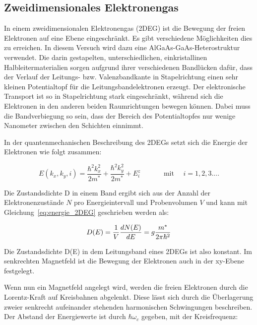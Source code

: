 
\subsection{Zweidimensionales Elektronengas}

In einem zweidimensionalen Elektronengas (2DEG) ist die Bewegung der freien Elektronen auf eine Ebene eingeschränkt. Es gibt verschiedene Möglichkeiten dies zu erreichen. In diesem Versuch wird dazu eine AlGaAs-GaAs-Heterostruktur verwendet. Die darin gestapelten, unterschiedlichen, einkristallinen Halbleitermaterialien sorgen aufgrund ihrer verschiedenen Bandlücken dafür, dass der Verlauf der Leitungs- bzw. Valenzbandkante in Stapelrichtung einen sehr kleinen Potentialtopf für die Leitungsbandelektronen erzeugt. Der elektronische Transport ist so in Stapelrichtung stark eingeschränkt, während sich die Elektronen in den anderen beiden Raumrichtungen bewegen können. Dabei muss die Bandverbiegung so sein, dass der Bereich des Potentialtopfes nur wenige Nanometer zwischen den Schichten einnimmt.

In der quantenmechanischen Beschreibung des 2DEGs setzt sich die Energie der Elektronen wie folgt zusammen:

\begin{equation}
E(k_x,k_y,i)=\frac{\hbar^2k_x^2}{2m^*}+\frac{\hbar^2k_y^2}{2m^*}+E_i^z   \text{~~~~~~~~~ mit ~~~} i=1,2,3....
\label{eq:energie_2DEG}
\end{equation}

Die Zustandsdichte D in einem Band ergibt sich aus der Anzahl der Elektronenzustände $N$ pro Energieintervall und Probenvolumen $V$ und kann mit Gleichung~\eqref{eq:energie_2DEG} geschrieben werden als:

\begin{equation}
	D(E)=\frac{1}{V}\frac{d N(E)}{d E}=g\frac{m^*}{2\pi\hbar^2}
	\label{eq:2DEG_zustandsdich} 
\end{equation}

Die Zustandsdichte D(E) in dem Leitungsband eines 2DEGs ist also konstant. Im senkrechten Magnetfeld ist die Bewegung der Elektronen auch in der xy-Ebene festgelegt.

Wenn nun ein Magnetfeld angelegt wird, werden die freien Elektronen durch die Lorentz-Kraft auf Kreisbahnen abgelenkt. Diese lässt sich durch die Überlagerung zweier senkrecht aufeinander stehenden harmonischen Schwingungen beschreiben. Der Abstand der Energiewerte ist durch $\hbar \omega_c$ gegeben,
mit der Kreisfrequenz:

